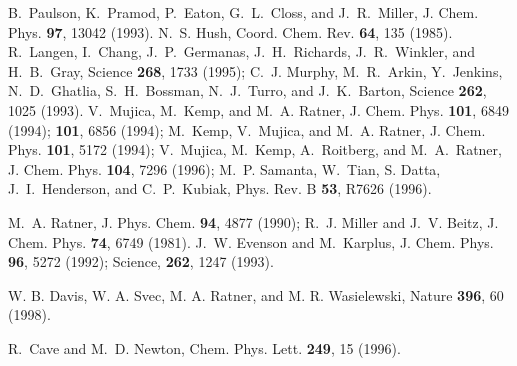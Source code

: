 \documentclass[12pt,twoside,a4paper]{report}
\begin{document}
{\begin{thebibliography}{999}
      B.~Paulson, K.~Pramod, P.~Eaton, 
                  G.~L.~Closs, and J.~R.~Miller, 
                  { J. Chem. Phys.}  {\bf 97}, 13042 (1993).
      N.~S. Hush, { Coord. Chem. Rev.} {\bf 64}, 135 (1985).
      R.~Langen, I.~Chang, J.~P.~Germanas, J.~H.~Richards, 
                  J.~R.~Winkler, and H.~B.~Gray, { Science} {\bf 268}, 1733 (1995);
                  C.~J. Murphy, M.~R.~Arkin, Y.~Jenkins, N.~D.~Ghatlia, S.~H.~Bossman, N.~J.~Turro, and J.~K.~Barton, 
                  { Science} {\bf 262}, 1025 (1993).
     V.~Mujica, M.~Kemp, and M.~A. Ratner, 
                  {  J. Chem. Phys.}  {\bf 101}, 6849 (1994);
                                      {\bf 101}, 6856 (1994);
                  M.~Kemp, V.~Mujica, and M.~A. Ratner, 
                  { J. Chem. Phys.}  {\bf 101}, 5172 (1994);
                  V.~Mujica, M.~Kemp, A.~Roitberg, and M.~A.~Ratner, 
                  { J. Chem. Phys.}  {\bf 104}, 7296 (1996);
                  M.~P. Samanta, W.~Tian, S. Datta, 
                  J.~I.~Henderson, and C.~P.~Kubiak, 
                  { Phys. Rev. B} {\bf 53}, R7626 (1996).
















      M.~A. Ratner, { J. Phys. Chem.}  {\bf 94}, 4877 (1990);
                  R.~J. Miller and J.~V. Beitz, { J. Chem. Phys.}  {\bf 74}, 6749 (1981).
      J.~W. Evenson and M.~Karplus,  
                  { J. Chem. Phys.}  {\bf 96}, 5272 (1992);
                  { Science}, {\bf 262}, 1247 (1993).



      W. B. Davis, W. A. Svec, M. A. Ratner, and M. R. Wasielewski,
                      Nature {\bf 396}, 60 (1998).

      R.~Cave and M.~D. Newton, { Chem. Phys. Lett.} {\bf 249}, 15 (1996).


\end{thebibliography}}
\end{document}
